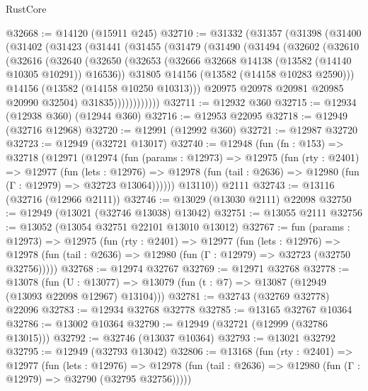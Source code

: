 \begin{lexlean}{RustCore}
\begin{coremodule}
@32668 := @14120 (@15911 @245)
@32710 := @31332
    (@31357
      (@31398
        (@31400
          (@31402
            (@31423
              (@31441
                (@31455
                  (@31479
                    (@31490
                      (@31494
                        (@32602
                          (@32610
                            (@32616
                              (@32640
                                (@32650
                                  (@32653
                                    (@32666 @32668 @14138 (@13582 (@14140 @10305 @10291)) @16536))
                                  @31805
                                  @14156
                                  (@13582 (@14158 @10283 @2590)))
                                @14156
                                (@13582 (@14158 @10250 @10313)))
                              @20975
                              @20978
                              @20981
                              @20985
                              @20990
                              @32504)
                            @31835))))))))))))
@32711 := @12932 @360
@32715 := @12934 (@12938 @360) (@12944 @360)
@32716 := @12953 @22095
@32718 := @12949 (@32716 @12968)
@32720 := @12991 (@12992 @360)
@32721 := @12987 @32720
@32723 := @12949 (@32721 @13017)
@32740 := @12948
    (fun (fn : @153) =>
    @32718
      (@12971
        (@12974
          (fun (params : @12973) =>
          @12975
            (fun (rty : @2401) =>
            @12977
              (fun (lets : @12976) =>
              @12978 (fun (tail : @2636) => @12980 (fun (Γ : @12979) => @32723 @13064))))))
        @13110))
    @2111
@32743 := @13116 (@32716 (@12966 @2111))
@32746 := @13029 (@13030 @2111) @22098
@32750 := @12949 (@13021 (@32746 @13038) @13042)
@32751 := @13055 @2111
@32756 := @13052 (@13054 @32751 @22101 @13010 @13012)
@32767 := fun (params : @12973) =>
  @12975
    (fun (rty : @2401) =>
    @12977
      (fun (lets : @12976) =>
      @12978 (fun (tail : @2636) => @12980 (fun (Γ : @12979) => @32723 (@32750 @32756)))))
@32768 := @12974 @32767
@32769 := @12971 @32768
@32778 := @13078
    (fun (U : @13077) => @13079 (fun (t : @7) => @13087 (@12949 (@13093 @22098 @12967) @13104)))
@32781 := @32743 (@32769 @32778) @22096
@32783 := @12934 @32768 @32778
@32785 := @13165 @32767 @10364
@32786 := @13002 @10364
@32790 := @12949 (@32721 (@12999 (@32786 @13015)))
@32792 := @32746 (@13037 @10364)
@32793 := @13021 @32792
@32795 := @12949 (@32793 @13042)
@32806 := @13168
    (fun (rty : @2401) =>
    @12977
      (fun (lets : @12976) =>
      @12978 (fun (tail : @2636) => @12980 (fun (Γ : @12979) => @32790 (@32795 @32756)))))

\end{coremodule}
\end{lexlean}
